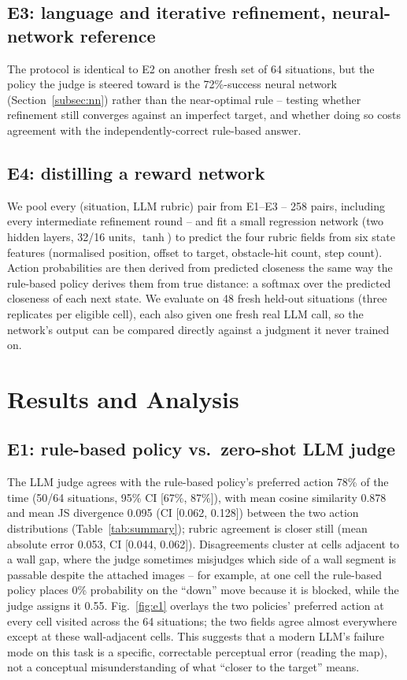 \documentclass[10pt,twocolumn]{article}
\begin{document}
\subsection{E3: language and iterative refinement, neural-network
reference}
The protocol is identical to E2 on another fresh set of 64 situations,
but the policy the judge is steered toward is the 72\%-success neural
network (Section~\ref{subsec:nn}) rather than the near-optimal rule --
testing whether refinement still converges against an imperfect target,
and whether doing so costs agreement with the independently-correct
rule-based answer.

\subsection{E4: distilling a reward network}
We pool every (situation, LLM rubric) pair from E1--E3 -- 258 pairs,
including every intermediate refinement round -- and fit a small
regression network (two hidden layers, 32/16 units, $\tanh$) to predict
the four rubric fields from six state features (normalised position,
offset to target, obstacle-hit count, step count). Action probabilities
are then derived from predicted closeness the same way the rule-based
policy derives them from true distance: a softmax over the predicted
closeness of each next state. We evaluate on 48 fresh held-out
situations (three replicates per eligible cell), each also given one
fresh real LLM call, so the network's output can be compared directly
against a judgment it never trained on.

\section{Results and Analysis}
\label{sec:results}

\subsection{E1: rule-based policy vs.\ zero-shot LLM judge}
The LLM judge agrees with the rule-based policy's preferred action 78\%
of the time (50/64 situations, 95\% CI [67\%, 87\%]), with mean cosine
similarity 0.878 and mean JS divergence 0.095 (CI [0.062, 0.128])
between the two action distributions (Table~\ref{tab:summary}); rubric
agreement is closer still (mean absolute error 0.053, CI [0.044,
0.062]). Disagreements cluster at cells adjacent to a wall gap, where
the judge sometimes misjudges which side of a wall segment is passable
despite the attached images -- for example, at one cell the rule-based
policy places 0\% probability on the ``down'' move because it is
blocked, while the judge assigns it 0.55. Fig.~\ref{fig:e1} overlays the
two policies' preferred action at every cell visited across the 64
situations; the two fields agree almost everywhere except at these
wall-adjacent cells. This suggests that a modern LLM's failure mode on
this task is a specific, correctable perceptual error (reading the
map), not a conceptual misunderstanding of what ``closer to the
target'' means.
\end{document}

